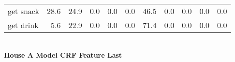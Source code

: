\documentclass{article}
\begin{document}
\begin{sideways}
\begin{tabular}{lrrrrrrrrrr}
get snack         &        28.6 &               24.9 &               0.0 &                0.0 &                0.0 &             46.5 &                      0.0 &                   0.0 &              0.0 &              0.0 \\
get drink         &         5.6 &               22.9 &               0.0 &                0.0 &                0.0 &             71.4 &                      0.0 &                   0.0 &              0.0 &              0.0 \\
\bottomrule
\end{tabular}
\end{sideways}
\normalsize
\vspace{1cm}\\
\textbf{House A Model CRF Feature Last}\\
\vspace{1cm}\\
\end{document}
